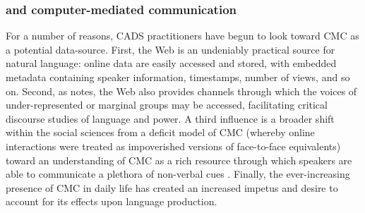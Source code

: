 


\subsubsection{ and computer-mediated communication}

For a number of reasons, \gls{CADS} practitioners have begun to look toward \gls{CMC} as a potential data\hyp{}source. First, the Web is an undeniably practical source for natural language: online data are easily accessed and stored, with embedded metadata containing speaker information, timestamps, number of views, and so on. Second, as \textcite{mautner_time_2005} notes, the Web also provides channels through which the voices of under\hyp{}represented or marginal groups may be accessed, facilitating critical discourse studies of language and power. A third influence is a broader shift within the social sciences from a deficit model of \gls{CMC} (whereby online interactions were treated as impoverished versions of face\hyp{}to\hyp{}face equivalents) toward an understanding of \gls{CMC} as a rich resource through which speakers are able to communicate a plethora of non\hyp{}verbal cues \cite{dresner_functions_2010,schandorf_mediated_2013}. Finally, the ever\hyp{}increasing presence of \gls{CMC} in daily life has created an increased impetus and desire to account for its effects upon language production.

